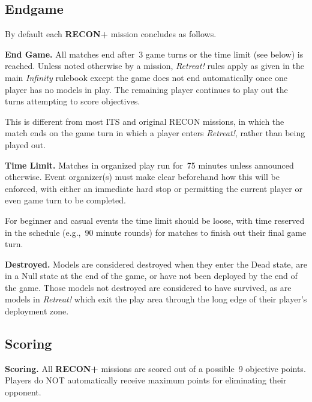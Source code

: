\documentclass[14pt,dvipsnames]{extarticle}
\newcommand{\missionrule}[1]{\noindent\textbf{#1}\xspace}
\newcommand{\reconplus}{\textbf{RECON+}\xspace}
\begin{document}
\subsection{Endgame}

By default each \reconplus mission concludes as follows.

\missionrule{End Game.}  All matches end after~3 game turns or the
time limit (see below) is reached.  Unless noted otherwise by a
mission, \emph{Retreat!} rules apply as given in the main
\emph{Infinity} rulebook except the game does not end automatically
once one player has no models in play.  The remaining player continues
to play out the turns attempting to score objectives.

\begin{recon}
  This is different from most ITS and original RECON missions, in
  which the match ends on the game turn in which a player enters
  \emph{Retreat!}, rather than being played out.
\end{recon}


\missionrule{Time Limit.} Matches in organized play run for~75 minutes
unless announced otherwise.  Event organizer(s) must make clear
beforehand how this will be enforced, with either an immediate hard
stop or permitting the current player or even game turn to be
completed.

\begin{recon}
  For beginner and casual events the time limit should be loose, with
  time reserved in the schedule (e.g.,~90 minute rounds) for matches
  to finish out their final game turn.
\end{recon}

\missionrule{Destroyed.} Models are considered destroyed when they
enter the Dead state, are in a Null state at the end of the game, or
have not been deployed by the end of the game.  Those models not
destroyed are considered to have survived, as are models in
\emph{Retreat!} which exit the play area through the long edge of
their player's deployment zone.

\subsection{Scoring}

\missionrule{Scoring.}  All \reconplus missions are scored out of a
possible~9 objective points.  Players do NOT automatically receive
maximum points for eliminating their opponent.
  
\end{document}
